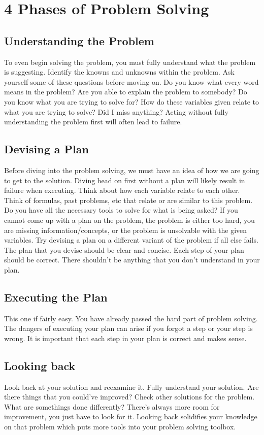 \documentclass[12pt]{article}
\begin{document}
\section{4 Phases of Problem Solving}
\subsection{Understanding the Problem}
To even begin solving the problem, you must fully understand
what the problem is suggesting. Identify the knowns and unknowns
within the problem. Ask yourself some of these questions before moving on.
Do you know what every word means in the problem? Are you able to explain
the problem to somebody? Do you know what you are trying to solve for? How do 
these variables given relate to what you are trying to solve? Did I miss anything?
Acting without fully understanding the problem first will often lead to failure.

\subsection{Devising a Plan}
Before diving into the problem solving, we must have an idea of 
how we are going to get to the solution. Diving head on first without a plan will likely result in failure when executing.
Think about how each variable relate to each other. Think of formulas, past problems, etc that relate or 
are similar to this problem. Do you have all the necessary tools to solve for what is being asked?
If you cannot come up with a plan on the problem, the problem is either too hard, you are missing information/concepts, or the problem is unsolvable 
with the given variables. Try devising a plan on a different variant of the problem if all else fails. 
The plan that you devise should be clear and concise. Each step of your plan should be correct.
There shouldn't be anything that you don't understand in your plan.

\subsection{Executing the Plan}
This one if fairly easy. You have already passed the hard part of problem solving.
The dangers of executing your plan can arise if you forgot a step or your step is wrong.
It is important that each step in your plan is correct and makes sense.

\subsection{Looking back}
Look back at your solution and reexamine it. Fully understand 
your solution. Are there things that you could've improved? Check
other solutions for the problem. What are somethings done differently?
There's always more room for improvement, you just have to look for it.
Looking back solidifies your knowledge on that problem which puts more tools into your problem solving toolbox.
\end{document}
